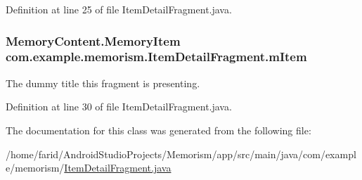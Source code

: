 Definition at line 25 of file Item\+Detail\+Fragment.\+java.

\subsubsection[{\texorpdfstring{m\+Item}{mItem}}]{\setlength{\rightskip}{0pt plus 5cm}Memory\+Content.\+Memory\+Item com.\+example.\+memorism.\+Item\+Detail\+Fragment.\+m\+Item\hspace{0.3cm}{\ttfamily [static]}}\hypertarget{classcom_1_1example_1_1memorism_1_1_item_detail_fragment_ac763290f824e91141020dc2a61e424b4}{}\label{classcom_1_1example_1_1memorism_1_1_item_detail_fragment_ac763290f824e91141020dc2a61e424b4}
The dummy title this fragment is presenting. 

Definition at line 30 of file Item\+Detail\+Fragment.\+java.



The documentation for this class was generated from the following file\+:\begin{DoxyCompactItemize}
\item 
/home/farid/\+Android\+Studio\+Projects/\+Memorism/app/src/main/java/com/example/memorism/\hyperlink{_item_detail_fragment_8java}{Item\+Detail\+Fragment.\+java}\end{DoxyCompactItemize}
